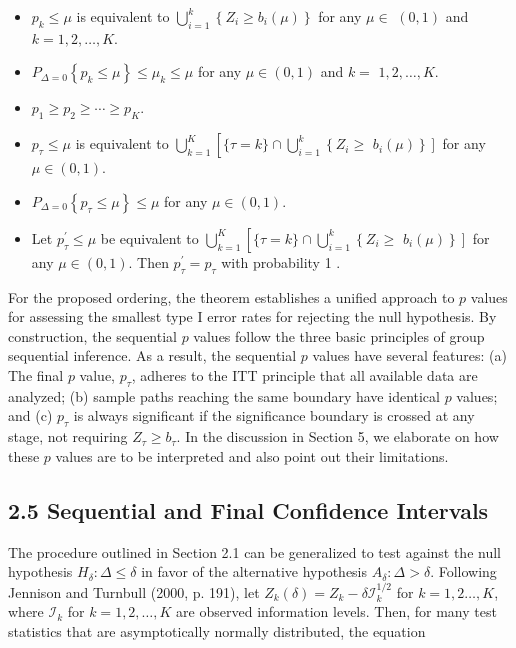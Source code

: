 \documentclass[10pt]{article}
\begin{document}
\begin{itemize}
  \item[a.] $p_{k} \leq \mu$ is equivalent to $\bigcup_{i=1}^{k}\left\{Z_{i} \geq b_{i}(\mu)\right\}$ for any $\mu \in$ $(0,1)$ and $k=1,2, \ldots, K$.
  \item[b.] $P_{\Delta=0}\left\{p_{k} \leq \mu\right\} \leq \mu_{k} \leq \mu$ for any $\mu \in(0,1)$ and $k=$ $1,2, \ldots, K$.
  \item[c.] $p_{1} \geq p_{2} \geq \cdots \geq p_{K}$.
  \item[d.] $p_{\tau} \leq \mu$ is equivalent to $\bigcup_{k=1}^{K}\left[\{\tau=k\} \cap \bigcup_{i=1}^{k}\left\{Z_{i} \geq\right.\right.$ $\left.\left.b_{i}(\mu)\right\}\right]$ for any $\mu \in(0,1)$.
  \item[e.] $P_{\Delta=0}\left\{p_{\tau} \leq \mu\right\} \leq \mu$ for any $\mu \in(0,1)$.
  \item[f.] Let $p_{\tau}^{\prime} \leq \mu$ be equivalent to $\bigcup_{k=1}^{K}\left[\{\tau=k\} \cap \bigcup_{i=1}^{k}\left\{Z_{i} \geq\right.\right.$ $\left.\left.b_{i}(\mu)\right\}\right]$ for any $\mu \in(0,1)$. Then $p_{\tau}^{\prime}=p_{\tau}$ with probability 1 .
\end{itemize}

For the proposed ordering, the theorem establishes a unified approach to $p$ values for assessing the smallest type I error rates for rejecting the null hypothesis. By construction, the sequential $p$ values follow the three basic principles of group sequential inference. As a result, the sequential $p$ values have several features: (a) The final $p$ value, $p_{\tau}$, adheres to the ITT principle that all available data are analyzed; (b) sample paths reaching the same boundary have identical $p$ values; and (c) $p_{\tau}$ is always significant if the significance boundary is crossed at any stage, not requiring $Z_{\tau} \geq b_{\tau}$. In the discussion in Section 5, we elaborate on how these $p$ values are to be interpreted and also point out their limitations.

\subsection*{2.5 Sequential and Final Confidence Intervals}
The procedure outlined in Section 2.1 can be generalized to test against the null hypothesis $H_{\delta}: \Delta \leq \delta$ in favor of the alternative hypothesis $A_{\delta}: \Delta>\delta$. Following Jennison and Turnbull (2000, p. 191), let $Z_{k}(\delta)=Z_{k}-\delta \mathcal{I}_{k}^{1 / 2}$ for $k=1,2 \ldots, K$, where $\mathcal{I}_{k}$ for $k=1,2, \ldots, K$ are observed information levels. Then, for many test statistics that are asymptotically normally distributed, the equation
\end{document}
